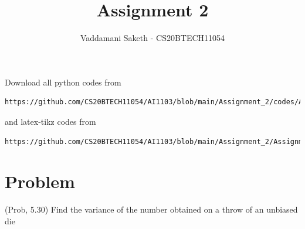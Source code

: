 \documentclass[journal,12pt,twocolumn]{IEEEtran}
\begin{document}
     \def\rightbox#1{\makebox[0in][r]{#1}}
     \def\centbox#1{\makebox[0in]{#1}}
     \def\topbox#1{\raisebox{-\baselineskip}[0in][0in]{#1}}
     \def\midbox#1{\raisebox{-0.5\baselineskip}[0in][0in]{#1}}
\vspace{3cm}
\title{Assignment 2}
\author{Vaddamani Saketh - CS20BTECH11054}
\maketitle
\newpage
\bigskip
\renewcommand{\thefigure}{\theenumi}
\renewcommand{\thetable}{\theenumi}
Download all python codes from 
\begin{lstlisting}
https://github.com/CS20BTECH11054/AI1103/blob/main/Assignment_2/codes/Assignment_2.py
\end{lstlisting}
%
and latex-tikz codes from 
%
\begin{lstlisting}
https://github.com/CS20BTECH11054/AI1103/blob/main/Assignment_2/Assignment_2.tex
\end{lstlisting}
\section{Problem}
(Prob, 5.30) Find the variance of the number obtained on a throw of an unbiased die
\end{document}
